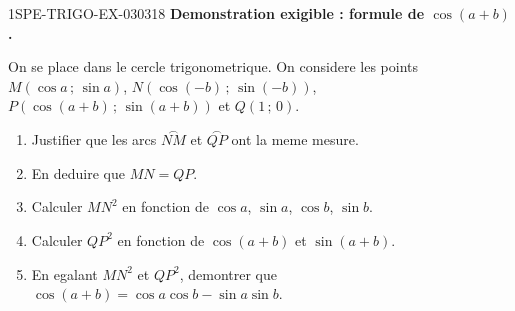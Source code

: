 \begin{exercice}{1SPE-TRIGO-EX-030}{3}{18}
\textbf{Demonstration exigible : formule de $\cos(a+b)$.}

On se place dans le cercle trigonometrique. On considere les points $M(\cos a\,;\,\sin a)$, $N(\cos(-b)\,;\,\sin(-b))$, $P(\cos(a+b)\,;\,\sin(a+b))$ et $Q(1\,;\,0)$.
\begin{enumerate}
  \item Justifier que les arcs $\overset{\frown}{NM}$ et $\overset{\frown}{QP}$ ont la meme mesure.
  \item En deduire que $MN = QP$.
  \item Calculer $MN^2$ en fonction de $\cos a$, $\sin a$, $\cos b$, $\sin b$.
  \item Calculer $QP^2$ en fonction de $\cos(a+b)$ et $\sin(a+b)$.
  \item En egalant $MN^2$ et $QP^2$, demontrer que $\cos(a+b) = \cos a \cos b - \sin a \sin b$.
\end{enumerate}
\end{exercice}
